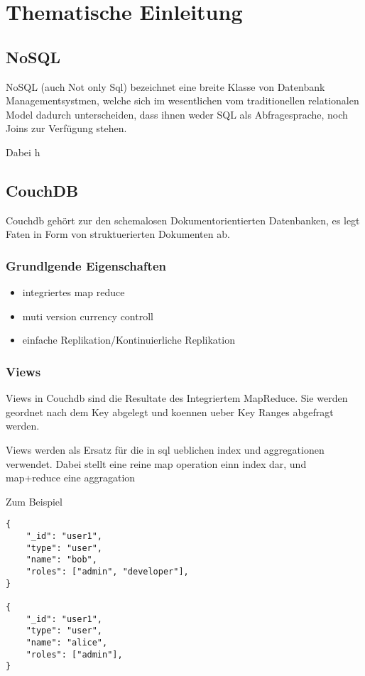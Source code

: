 \chapter{Thematische Einleitung}

\section{NoSQL}

NoSQL (auch Not only Sql) bezeichnet eine breite Klasse
von Datenbank Managementsystmen, welche sich im wesentlichen
vom traditionellen relationalen Model dadurch unterscheiden,
dass ihnen weder SQL als Abfragesprache, noch Joins zur Verfügung stehen.

Dabei h

\section{CouchDB}

Couchdb gehört zur den schemalosen Dokumentorientierten Datenbanken,
es legt Faten in Form von struktuerierten Dokumenten ab.

\subsection{Grundlgende Eigenschaften}

\begin{itemize}
\item integriertes map reduce
\item muti version currency controll
\item einfache Replikation/Kontinuierliche Replikation


\end{itemize}


\subsection{Views}

Views in Couchdb sind die Resultate des Integriertem MapReduce.
Sie werden geordnet nach dem Key abgelegt und koennen ueber Key Ranges abgefragt werden.


Views werden als Ersatz für die in sql ueblichen index und aggregationen verwendet.
Dabei stellt eine  reine map operation einn index dar, und map+reduce eine aggragation

\newpage
Zum Beispiel
\begin{lstlisting}
{
    "_id": "user1",
    "type": "user",
    "name": "bob",
    "roles": ["admin", "developer"],
}

{
    "_id": "user1",
    "type": "user",
    "name": "alice",
    "roles": ["admin"],
}
\end{lstlisting}



